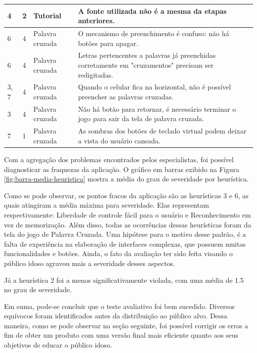 \begin{table}[H]
\begin{tabular}{p{1.5cm} p{2cm} p{4cm} p{8.5cm}}
\\ \midrule
4
& 
2
&
Tutorial
&
A fonte utilizada não é a mesma da etapas anteriores.
\\ \midrule
6
& 
4
&
Palavra cruzada
&
O mecanismo de preenchimento é confuso: não há botões para apagar.
\\ \midrule
6
& 
4
&
Palavra cruzada
&
Letras pertencentes a palavras já preenchidas corretamente em "cruzamentos" precisam ser redigitadas.
\\ \midrule
3, 7
& 
4
&
Palavra cruzada
&
Quando o celular fica na horizontal, não é possível preencher as palavras cruzadas.
\\ \midrule
3
& 
4
&
Palavra cruzada
&
Não há botão para retornar, é necessário terminar o jogo para sair da tela de palavra cruzada.
\\ \midrule
7
& 
1
&
Palavra cruzada
&
As sombras dos botões de teclado virtual podem deixar a vista do usuário cansada.
\\ \bottomrule

\end{tabular}
\label{tab:avaliacaonielsen}
\end{table}

Com a agregação dos problemas encontrados pelos especialistas, foi possível diagnosticar as fraquezas da aplicação. O gráfico em barras exibido na Figura \ref{fig:barra-media-heuristica} mostra a média do grau de severidade por heurística.

Como se pode observar, os pontos fracos da aplicação são as heurísticas 3 e 6, as quais atingiram a média máxima para severidade. Elas representam respectivamente: Liberdade de controle fácil para o usuário e Reconhecimento em vez de memorização. Além disso, todas as ocorrências dessas heurísticas foram da tela do jogo de Palavra Cruzada. Uma hipótese para o motivo desse padrão, é a falta de experiência na elaboração de interfaces complexas, que possuem muitas funcionalidades e botões. Ainda, o fato da avaliação ter sido feita visando o público idoso agravou mais a severidade desses aspectos. 

Já a heurística 2 foi a menos significativamente violada, com uma média de 1.5 no grau de severidade.

Em suma, pode-se concluir que o teste avaliativo foi bem sucedido. Diversos equívocos foram identificados antes da distribuição ao público alvo. Dessa maneira, como se pode observar na seção seguinte, foi possível corrigir os erros a fim de obter um produto com uma versão final mais eficiente quanto aos seus objetivos de educar o público idoso.

